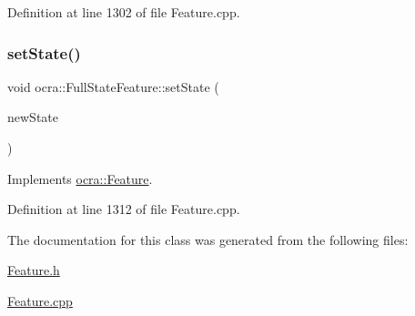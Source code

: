 Definition at line 1302 of file Feature.\+cpp.

\hypertarget{classocra_1_1FullStateFeature_a77263aff16d7078ac19dc2eb6a196a65}{}\label{classocra_1_1FullStateFeature_a77263aff16d7078ac19dc2eb6a196a65} 
\subsubsection{\texorpdfstring{set\+State()}{setState()}}
{\footnotesize\ttfamily void ocra\+::\+Full\+State\+Feature\+::set\+State (\begin{DoxyParamCaption}\item[{const \hyperlink{classocra_1_1TaskState}{Task\+State} \&}]{new\+State }\end{DoxyParamCaption})\hspace{0.3cm}{\ttfamily [virtual]}}



Implements \hyperlink{classocra_1_1Feature_ad16d6b176b229280649ab405531e9a30}{ocra\+::\+Feature}.



Definition at line 1312 of file Feature.\+cpp.



The documentation for this class was generated from the following files\+:\begin{DoxyCompactItemize}
\item 
\hyperlink{Feature_8h}{Feature.\+h}\item 
\hyperlink{Feature_8cpp}{Feature.\+cpp}\end{DoxyCompactItemize}
